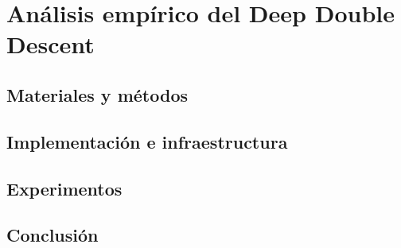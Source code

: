 
\chapter{Análisis empírico del Deep Double Descent}\label{ch:analisis-empirico-ddd}

\section{Materiales y métodos}\label{sec:materiales-y-metodos}

\section{Implementación e infraestructura}\label{sec:implementacion-e-infraestructura}

\section{Experimentos}\label{sec:experimentos}

\section{Conclusión}\label{sec:conclusion-informatica}

\endinput